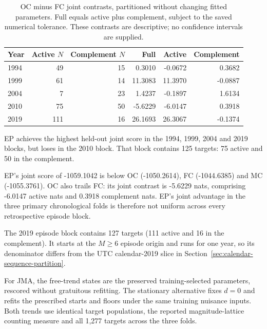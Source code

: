 \begin{table}[htbp]\centering\caption{OC minus FC joint contrasts, partitioned without changing fitted parameters. Full equals active plus complement, subject to the saved numerical tolerance. These contrasts are descriptive; no confidence intervals are supplied.}

\begin{tabular}{lrrrrr}\toprule Year & Active $N$ & Complement $N$ & Full & Active & Complement\\\midrule

1994 & 49 & 15 & 0.3010 & -0.0672 & 0.3682 \\

1999 & 61 & 14 & 11.3083 & 11.3970 & -0.0887 \\

2004 & 7 & 23 & 1.4237 & -0.1897 & 1.6134 \\

2010 & 75 & 50 & -5.6229 & -6.0147 & 0.3918 \\

2019 & 111 & 16 & 26.1693 & 26.3067 & -0.1374 \\

\bottomrule\end{tabular}\end{table}

EP achieves the highest held-out joint score in the 1994, 1999, 2004 and 2019 blocks, but loses in the 2010 block. That block contains 125 targets: 75 active and 50 in the complement.

EP's joint score of -1059.1042 is below OC (-1050.2614), FC (-1044.6385) and MC (-1055.3761). OC also trails FC: its joint contrast is -5.6229 nats, comprising -6.0147 active nats and 0.3918 complement nats. EP's joint advantage in the three primary chronological folds is therefore not uniform across every retrospective episode block.

The 2019 episode block contains 127 targets (111 active and 16 in the complement). It starts at the $M\geq6$ episode origin and runs for one year, so its denominator differs from the UTC calendar-2019 slice in Section~\ref{sec:calendar-sequence-partition}.

For JMA, the free-trend states are the preserved training-selected parameters, rescored without gratuitous refitting. The stationary alternative fixes $d=0$ and refits the prescribed starts and floors under the same training nuisance inputs. Both trends use identical target populations, the reported magnitude-lattice counting measure and all 1,277 targets across the three folds.

